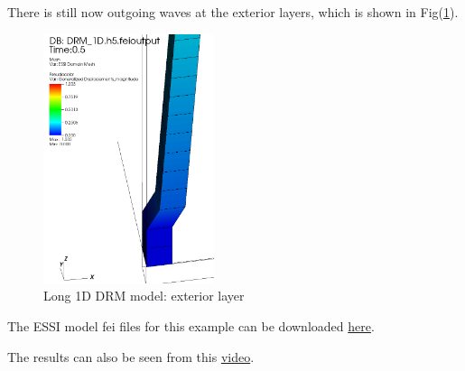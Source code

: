 There is still now outgoing waves at the exterior layers, which is shown in Fig(\ref{fig_Long_1D_DRM_model_exterior_layer}).
\begin{figure}[!htb]
  \centering
  \includegraphics[width=5cm]{./Figure-files/_Chapter_Appendix_Illustrative_Examples/long_DRM_part.png}
  \caption{Long 1D DRM model: exterior layer}
  \label{fig_Long_1D_DRM_model_exterior_layer}
\end{figure}


The ESSI model fei files for this example can be downloaded 
\href{https://github.com/BorisJeremic/Real-ESSI-Examples/blob/master/model_fei_file/8NodeBrick_DRM_1D_long/8NodeBrick_DRM_1D_long.tgz?raw=true}{here}.

The results can also be seen from this 
\href{http://sokocalo.engr.ucdavis.edu/~jeremic/lecture_notes_online_material/_Chapter_Applications_Earthquake_Soil_Structure_Interaction_General_Aspects/Animation_DRM_1D.mp4}{video}.














\clearpage  












